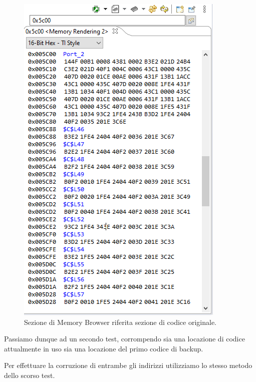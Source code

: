 \documentclass[LaM,binding=0.6cm]{../sapthesis}
\begin{document}
\begin{figure}[htbp]
\centerline{\includegraphics[scale=0.55]{examples/BootloaderTestCorruzioni1.PNG}}
\caption{Sezione di Memory Browser riferita sezione di codice originale.}
\label{fig}
\end{figure}
\newline


Passiamo dunque ad un secondo test, corrompendo sia una locazione di codice attualmente in uso sia una locazione del primo
codice di backup.

Per effettuare la corruzione di entrambe gli indirizzi utilizziamo lo stesso metodo dello scorso test.
\end{document}

